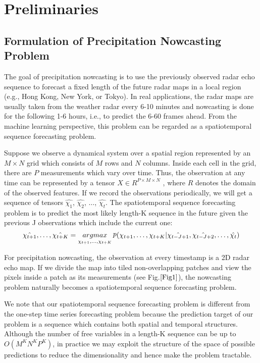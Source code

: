 \section{Preliminaries}
\subsection{Formulation of Precipitation Nowcasting Problem}

\par The goal of precipitation nowcasting is to use the previously observed radar echo sequence to forecast a fixed length of the future radar maps in a local region (e.g., Hong Kong, New York, or Tokyo). In real applications, the radar maps are usually taken from the weather radar every 6-10 minutes and nowcasting is done for the following 1-6 hours, i.e., to predict the 6-60 frames ahead. From the machine learning perspective, this problem can be regarded as a spatiotemporal sequence forecasting problem.

\par Suppose we observe a dynamical system over a spatial region represented by an $M \times N$ grid which consists of $M$ rows and $N$ columns. Inside each cell in the grid, there are $P$ measurements which vary over time. Thus, the observation at any time can be represented by a tensor $X \in R^{P\times M\times N}$ , where $R$ denotes the domain of the observed features. If we record the observations periodically, we will get a sequence of tensors $\hat{\chi _1}$, $\hat{\chi _2}$, $\dots$, $\hat{\chi _t}$. The spatiotemporal sequence forecasting problem is to predict the most likely length-K sequence in the future given the previous J observations which include the current one:
\begin{equation}
  \notag \hat{\chi _{t+1}}, \dots, \hat{\chi _{t+K}}= \mathop{argmax}\limits_{\chi _{t+1}, \dots, \chi _{t+K}} \mathop{p}(\chi _{t+1}, \dots, \chi _{t+K}|\hat{\chi _{t-J+1}}, \hat{\chi _{t-J+2}}, \dots, \hat{\chi _{t}})\label{Eq1}  
\end{equation}

\par For precipitation nowcasting, the observation at every timestamp is a 2D radar echo map. If we divide the map into tiled non-overlapping patches and view the pixels inside a patch as its measurements (see Fig.$\ref{Fig1}$), the nowcasting problem naturally becomes a spatiotemporal sequence forecasting problem.

\par We note that our spatiotemporal sequence forecasting problem is different from the one-step time series forecasting problem because the prediction target of our problem is a sequence which contains both spatial and temporal structures. Although the number of free variables in a length-K sequence can be up to $O(M^K N^K P^K)$, in practice we may exploit the structure of the space of possible predictions to reduce the dimensionality and hence make the problem tractable.

